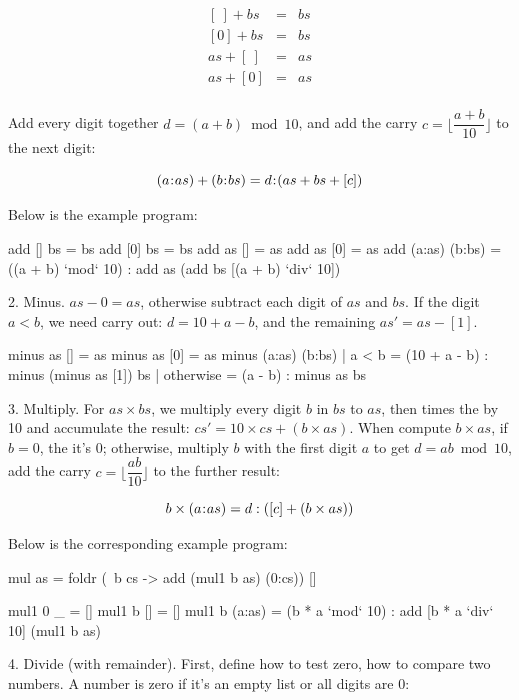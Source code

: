 \documentclass[b5paper]{article}
\begin{document}
\begin{Answer}[ref = {ex:list-others}]
{\[
\begin{array}{rcl}
\left[ \ \right] + bs & = & bs \\
\left[ 0 \right] + bs & = & bs \\
as + \left[\ \right] & = & as \\
as + \left[ 0 \right] & = & as \\
\end{array}
\]

Add every digit together $d = (a + b) \bmod 10$, and add the carry $c = \lfloor \dfrac{a + b}{10} \rfloor$ to the next digit:

\[
(a \mathbin{\!:\!} as) + (b \mathbin{\!:\!} bs) = d \mathbin{\!:\!} (as + bs + [c])
\]

Below is the example program:
\begin{Haskell}
add [] bs = bs
add [0] bs = bs
add as [] = as
add as [0] = as
add (a:as) (b:bs) = ((a + b) `mod` 10) : add as (add bs [(a + b) `div` 10])
\end{Haskell}

2. Minus. $as - 0 = as$, otherwise subtract each digit of $as$ and $bs$. If the digit $a < b$, we need carry out: $d = 10 + a - b$, and the remaining $as' = as - [1]$.

\begin{Haskell}
minus as [] = as
minus as [0] = as
minus (a:as) (b:bs) | a < b = (10 + a - b) : minus (minus as [1]) bs
                    | otherwise = (a - b) : minus as bs
\end{Haskell}

3. Multiply. For $as \times bs$, we multiply every digit $b$ in $bs$ to $as$, then times the by 10 and accumulate the result: $cs' = 10 \times cs + (b \times as)$. When compute $b \times as$, if $b = 0$, the it's $0$; otherwise, multiply $b$ with the first digit $a$ to get $d = ab \bmod 10$, add the carry $c = \lfloor \dfrac{ab}{10} \rfloor$ to the further result:

\[
b \times (a \mathbin{\!:\!} as) = d : ([c] + (b \times as))
\]

Below is the corresponding example program:

\begin{Haskell}
mul as = foldr (\ b cs -> add (mul1 b as) (0:cs)) []

mul1 0 _ = []
mul1 b [] = []
mul1 b (a:as) = (b * a `mod` 10) : add [b * a `div` 10] (mul1 b as)
\end{Haskell}

4. Divide (with remainder). First, define how to test zero, how to compare two numbers. A number is zero if it's an empty list or all digits are 0:

}
\end{Answer}
\end{document}
